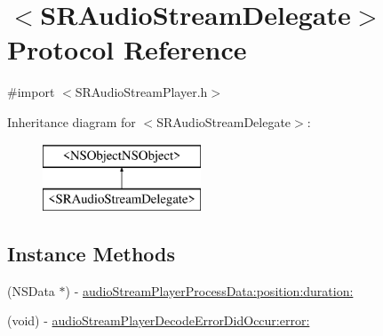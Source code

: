 \hypertarget{protocol_s_r_audio_stream_delegate-p}{\section{$<$S\-R\-Audio\-Stream\-Delegate$>$ Protocol Reference}
\label{protocol_s_r_audio_stream_delegate-p}
}


{\ttfamily \#import $<$S\-R\-Audio\-Stream\-Player.\-h$>$}

Inheritance diagram for $<$S\-R\-Audio\-Stream\-Delegate$>$\-:\begin{figure}[H]
\begin{center}
\leavevmode
\includegraphics[height=2.000000cm]{protocol_s_r_audio_stream_delegate-p}
\end{center}
\end{figure}
\subsection*{Instance Methods}
\begin{DoxyCompactItemize}
\item 
(N\-S\-Data $\ast$) -\/ \hyperlink{protocol_s_r_audio_stream_delegate-p_a05a117100e8cd7b0fbeaed7e1784c026}{audio\-Stream\-Player\-Process\-Data\-:position\-:duration\-:}
\item 
(void) -\/ \hyperlink{protocol_s_r_audio_stream_delegate-p_a6af6f8dc8e469351ad828d3343e6f9a6}{audio\-Stream\-Player\-Decode\-Error\-Did\-Occur\-:error\-:}
\end{DoxyCompactItemize}


